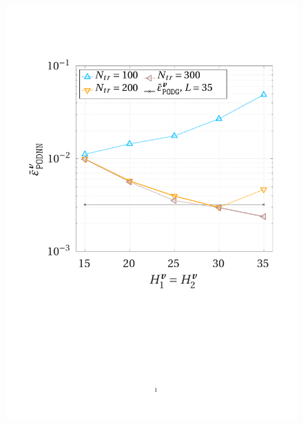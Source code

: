\documentclass[12pt, a4paper, twoside, openright, notitlepage]{report}
\numberwithin{equation}{chapter}
\theoremstyle{theorem}
\theoremstyle{definition}
\theoremstyle{remark}
\theoremstyle{proposition}
\numberwithin{figure}{chapter}
\begin{document}
		\begin{figure}[H]
			\center
			\includegraphics[scale = 0.37, trim = {1cm 9cm 1.5cm 3.5cm}, clip]{dc_200_vel_nn_convergence}
			\hspace*{0.6cm}

\end{figure}
\end{document}
